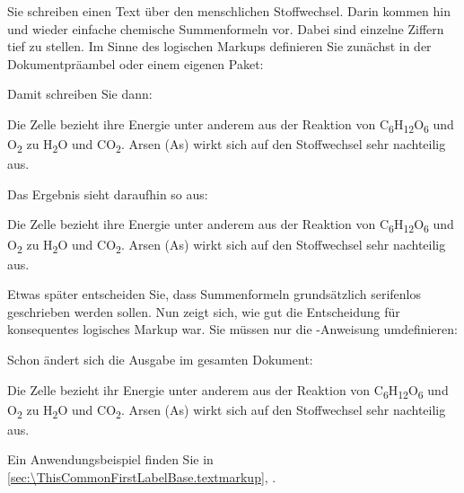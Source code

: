     \begin{Example}
      Sie schreiben einen Text über den menschlichen Stoffwechsel. Darin
      kommen hin und wieder einfache chemische Summenformeln vor. Dabei sind
      einzelne Ziffern tief zu stellen. Im Sinne des logischen Markups
      definieren Sie zunächst in der Dokumentpräambel oder einem eigenen
      Paket:
\begin{lstcode}
  \newcommand*{\Molek}[2]{#1\textsubscript{#2}}
\end{lstcode}
      \newcommand*{\Molek}[2]{#1\textsubscript{#2}}%
      Damit schreiben Sie dann:
\begin{lstcode}
  Die Zelle bezieht ihre Energie unter anderem aus
  der Reaktion von \Molek C6\Molek H{12}\Molek O6
  und \Molek O2 zu \Molek H2\Molek O{} und
  \Molek C{}\Molek O2. Arsen (\Molek{As}{}) wirkt
  sich auf den Stoffwechsel sehr nachteilig aus.
\end{lstcode}
      Das Ergebnis sieht daraufhin so aus:
      \begin{ShowOutput}
        Die Zelle bezieht ihre Energie unter anderem
        aus der Reaktion von
        \Molek C6\Molek H{12}\Molek O6 und \Molek O2 zu
        \Molek H2\Molek O{} und \Molek C{}\Molek O2.
        Arsen (\Molek{As}{}) wirkt sich auf
        den Stoffwechsel sehr nachteilig aus.
      \end{ShowOutput}

      Etwas später entscheiden Sie, dass Summenformeln grundsätzlich
      serifenlos geschrieben werden sollen. Nun zeigt sich, wie gut die
      Entscheidung für konsequentes logisches Markup war. Sie müssen nur die
      -Anweisung umdefinieren:
\begin{lstcode}
  \newcommand*{\Molek}[2]{%
    \textsf{#1\textsubscript{#2}}%
  }
\end{lstcode}
      \renewcommand*{\Molek}[2]{\textsf{#1\textsubscript{#2}}}%
      Schon ändert sich die Ausgabe im gesamten Dokument:
      \begin{ShowOutput}
        Die Zelle bezieht ihr Energie unter anderem aus der Reaktion von
        \Molek C6\Molek H{12}\Molek O6 und \Molek O2 zu \Molek H2\Molek
        O{} und \Molek C{}\Molek O2.  Arsen (\Molek{As}{}) wirkt sich
        auf den Stoffwechsel sehr nachteilig aus.
      \end{ShowOutput}
    \end{Example}
    %
  \else%
    Ein Anwendungsbeispiel finden Sie in
    \autoref{sec:\ThisCommonFirstLabelBase.textmarkup},
    .%
  \fi%
  \EndIndexGroup%
\fi


